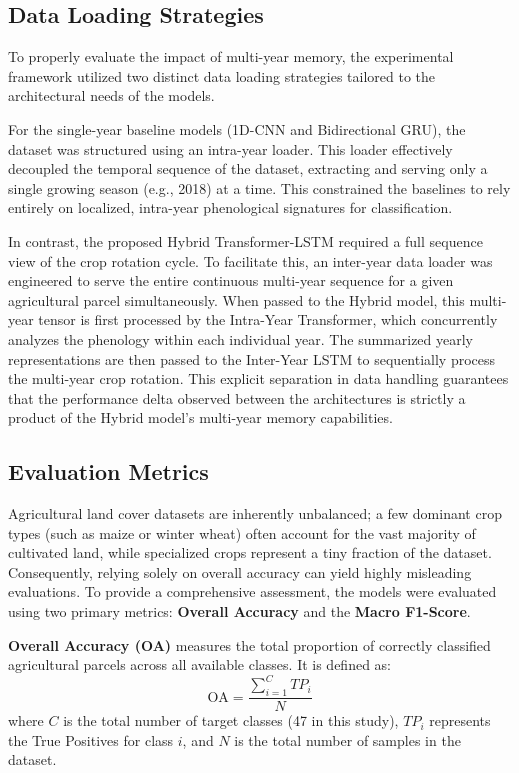 \subsection{Data Loading Strategies}
\label{subsec:data_loading}

To properly evaluate the impact of multi-year memory, the experimental framework utilized two distinct data loading
strategies tailored to the architectural needs of the models.

For the single-year baseline models (1D-CNN and Bidirectional GRU), the dataset was structured using an intra-year loader.
This loader effectively decoupled the temporal sequence of the dataset, extracting and serving only a single growing season (e.g., 2018) at a time.
This constrained the baselines to rely entirely on localized, intra-year phenological signatures for classification.

In contrast, the proposed Hybrid Transformer-LSTM required a full sequence view of the crop rotation cycle.
To facilitate this, an inter-year data loader was engineered to serve the entire continuous multi-year sequence for a given agricultural parcel simultaneously.
When passed to the Hybrid model, this multi-year tensor is first processed by the Intra-Year Transformer,
which concurrently analyzes the phenology within each individual year.
The summarized yearly representations are then passed to the Inter-Year LSTM to sequentially process the multi-year crop rotation.
This explicit separation in data handling guarantees that the performance delta observed between the architectures is strictly
a product of the Hybrid model's multi-year memory capabilities.

\subsection{Evaluation Metrics}
\label{subsec:evaluation_metrics}

Agricultural land cover datasets are inherently unbalanced; a few dominant crop types (such as maize or winter wheat) often account for the vast majority of cultivated land,
while specialized crops represent a tiny fraction of the dataset.
Consequently, relying solely on overall accuracy can yield highly misleading evaluations.
To provide a comprehensive assessment, the models were evaluated using two primary metrics: \textbf{Overall Accuracy} and the \textbf{Macro F1-Score}.

\textbf{Overall Accuracy (OA)} measures the total proportion of correctly classified agricultural parcels across all available classes. It is defined as:
$$ \text{OA} = \frac{\sum_{i=1}^{C} TP_i}{N} $$
where $C$ is the total number of target classes (47 in this study), $TP_i$ represents the True Positives for class $i$, and $N$ is the total number of samples in the dataset.

